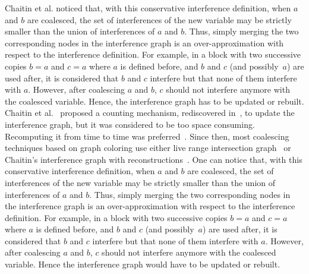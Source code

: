 \ifhab
Chaitin et al. noticed that, with this conservative interference definition,
when $a$ and $b$ are coalesced, the set of interferences of the new variable
may be strictly smaller than the union of interferences of $a$ and $b$. Thus,
simply merging the two corresponding nodes in the interference graph is an
over-approximation with respect to the interference definition.  For example,
in a block with two successive copies $b=a$ and $c=a$ where $a$ is defined
before, and $b$ and $c$ (and possibly~$a$) are used after, it is considered that
$b$ and $c$ interfere but that none of them interfere with $a$. However, after
coalescing $a$ and $b$, $c$ should not interfere anymore with the coalesced
variable.
Hence, the interference graph has to be updated or rebuilt. Chaitin et
al.~\cite{Chaitin81} proposed a counting mechanism, rediscovered
in~\cite{BD3+00}, to update the interference graph, but it was considered to be
too space consuming. Recomputing it from time to time was
preferred~\cite{Chaitin81,Chaitin82}. Since then, most coalescing techniques
based on graph coloring use either live range intersection
graph~\cite{VC+99,liverange.pldi02} or Chaitin's interference graph with
reconstructions~\cite{GA96,BriggsCT94}.
\else
One can notice that, with this conservative interference definition,
when $a$ and $b$ are coalesced, the set of interferences of the new variable
may be strictly smaller than the union of interferences of $a$ and $b$. Thus,
simply merging the two corresponding nodes in the interference graph is an
over-approximation with respect to the interference definition.  For example,
in a block with two successive copies $b=a$ and $c=a$ where $a$ is defined
before, and $b$ and $c$ (and possibly~$a$) are used after, it is considered that
$b$ and $c$ interfere but that none of them interfere with $a$. However, after
coalescing $a$ and $b$, $c$ should not interfere anymore with the coalesced
variable.
Hence the interference graph would have to be updated or rebuilt.
\fi

